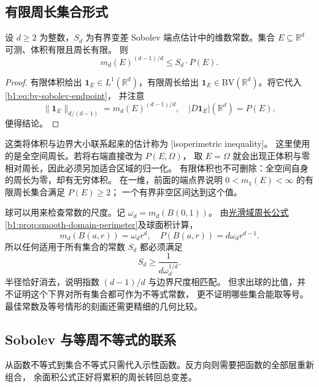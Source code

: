 \subsection{有限周长集合形式}
\label{b1:subsec:270602}

\begin{theorem}[有限周长集合的等周估计]\label{b1:thm:finite-perimeter-isoperimetric}
设 \(d\ge2\) 为整数，\(S_d\) 为有界变差 Sobolev 端点估计中的维数常数。集合 \(E\subseteq\mathbb R^d\) 可测、体积有限且周长有限。
则
\begin{equation}\label{b1:eq:finite-perimeter-isoperimetric}
 m_d(E)^{(d-1)/d}\le S_d\cdot P(E).
\end{equation}
\end{theorem}
\begin{proof}
有限体积给出 \(\mathbf1_E\in L^1(\mathbb R^d)\)，有限周长给出
\(\mathbf1_E\in \mathrm{BV}(\mathbb R^d)\)。将它代入\eqref{b1:eq:bv-sobolev-endpoint}，
并注意
\[
 \|\mathbf1_E\|_{d/(d-1)}=m_d(E)^{(d-1)/d},
 \quad |D\mathbf1_E|(\mathbb R^d)=P(E),
\]
便得结论。
\end{proof}

这类将体积与边界大小联系起来的估计称为%
[isoperimetric inequality]。
这里使用的是全空间周长。若将右端直接改为 \(P(E,\Omega)\)，
取 \(E=\Omega\) 就会出现正体积与零相对周长，因此必须另加适合区域的归一化。
有限体积也不可删除：全空间自身的周长为零，却有无穷体积。
在一维，前面的端点界说明 \(0<m_1(E)<\infty\) 的有限周长集合满足 \(P(E)\ge2\)；
一个有界非空区间达到这个值。

\ProseParagraphBreak

球可以用来检查常数的尺度。记 \(\omega_d=m_d(B(0,1))\)。
由\hyperref[b1:prop:smooth-domain-perimeter]{光滑域周长公式\ref*{b1:prop:smooth-domain-perimeter}\CJKecglue}及球面积计算，
\[
 m_d(B(a,r))=\omega_dr^d,\quad
 P(B(a,r))=d\omega_dr^{d-1}.
\]
所以任何适用于所有集合的常数 \(S_d\) 都必须满足
\[
 S_d\ge\frac1{d\omega_d^{1/d}}.
\]
半径恰好消去，说明指数 \((d-1)/d\) 与边界尺度相匹配。
但求出球的比值，并不证明这个下界对所有集合都可作为不等式常数，
更不证明哪些集合能取等号。最佳常数及等号情形的刻画还需更精细的几何比较。

\subsection{Sobolev 与等周不等式的联系}
\label{b1:subsec:270603}

从函数不等式到集合不等式只需代入示性函数。反方向则需要把函数的全部层重新组合，
余面积公式正好将累积的周长转回总变差。

